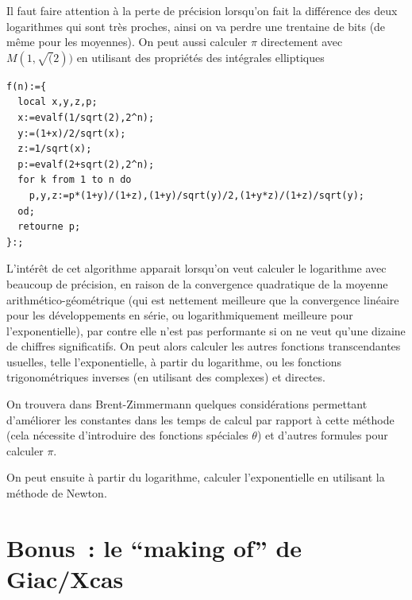 \documentclass[a4paper,11pt]{book}
\begin{document}
\begin{giacjshere}
Il faut faire attention \`a la perte de pr\'ecision lorsqu'on fait
la diff\'erence des deux logarithmes qui sont tr\`es proches, ainsi
on va perdre une trentaine de bits (de m\^eme pour les moyennes).
On peut aussi calculer $\pi$ directement avec $M(1,\sqrt(2))$ en
utilisant des propri\'et\'es des int\'egrales elliptiques
\begin{verbatim}
f(n):={
  local x,y,z,p;
  x:=evalf(1/sqrt(2),2^n);
  y:=(1+x)/2/sqrt(x);
  z:=1/sqrt(x);
  p:=evalf(2+sqrt(2),2^n);
  for k from 1 to n do
    p,y,z:=p*(1+y)/(1+z),(1+y)/sqrt(y)/2,(1+y*z)/(1+z)/sqrt(y);
  od;
  retourne p;
}:;
\end{verbatim}

L'int\'er\^et de cet algorithme apparait lorsqu'on veut calculer
le logarithme avec beaucoup de pr\'ecision, en raison de la
convergence quadratique de la moyenne arithm\'etico-g\'eom\'etrique
(qui est nettement meilleure que la convergence lin\'eaire
pour les d\'eveloppements en s\'erie, ou logarithmiquement
meilleure pour l'exponentielle), par contre elle n'est pas
performante si on ne veut qu'une dizaine de chiffres significatifs. 
On peut alors calculer les autres
fonctions transcendantes usuelles, telle l'exponentielle,
\`a partir du logarithme, ou les fonctions trigonom\'etriques
inverses (en utilisant des complexes) et directes.

On trouvera dans Brent-Zimmermann quelques consid\'erations permettant
d'am\'eliorer les constantes dans les temps de calcul par rapport
\`a cette m\'ethode (cela n\'ecessite d'introduire des fonctions 
sp\'eciales $\theta$) et d'autres formules pour calculer $\pi$.

On peut ensuite \`a partir du logarithme, calculer l'exponentielle
en utilisant la m\'ethode de Newton.



\pagebreak

\appendix

\chapter{Bonus~: le ``making of'' de Giac/Xcas}


\end{giacjshere}
\end{document}
